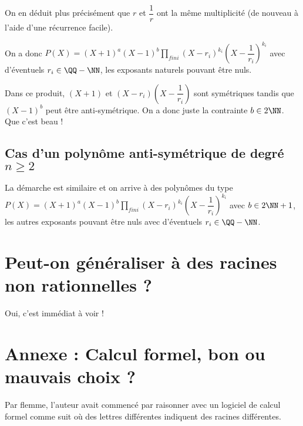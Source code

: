 \documentclass[12pt]{amsart}
\begin{document}
\medskip

On en déduit plus précisément que $r$ et $\dfrac1r$ ont la même multiplicité (de nouveau à l'aide d'une récurrence facile).


\medskip

On a donc
$\displaystyle P(X) = (X + 1)^a (X - 1)^b \prod_{fini} (X - r_i)^{k_i} \left( X - \dfrac1{r_i} \right)^{k_i}$ avec d'éventuels $r_i \in \QQ - \NN$, les exposants naturels pouvant être nuls.


\medskip

Dans ce produit, $(X + 1)$ et $(X - r_i) \left( X - \dfrac1{r_i} \right)$ sont symétriques tandis que $(X - 1)^b$ peut être anti-symétrique.
On a donc juste la contrainte $b \in 2 \NN$. Que c'est beau !


\subsection*{Cas d'un polynôme anti-symétrique de degré $n \geqslant 2$}

La démarche est similaire et on arrive à des polynômes du type
$\displaystyle P(X) = (X + 1)^a (X - 1)^b \prod_{fini} (X - r_i)^{k_i} \left( X - \dfrac1{r_i} \right)^{k_i}$
avec $b \in 2 \NN + 1$, les autres exposants pouvant être nuls avec d'éventuels $r_i \in \QQ - \NN$.



\section{Peut-on généraliser à des racines non rationnelles ?}

Oui, c'est immédiat à voir !



\section*{Annexe : Calcul formel, bon ou mauvais choix ?}

Par flemme, l'auteur avait commencé par raisonner avec un logiciel de calcul formel comme suit où des lettres différentes indiquent des racines différentes.
\end{document}
